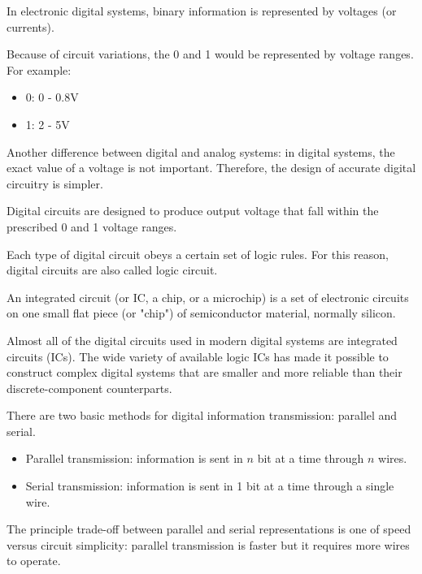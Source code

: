   \par In electronic digital systems, binary information is represented by voltages (or
  currents).
  \par Because of circuit variations, the 0 and 1 would be represented by voltage ranges.
  For example:
  \begin{itemize}
    \item 0: 0 - 0.8V
    \item 1: 2 - 5V
  \end{itemize}
  \par Another difference between digital and analog systems: in digital systems, the exact
  value of a voltage is not important. Therefore, the design of accurate digital circuitry is
  simpler.

    \par Digital circuits are designed to produce output voltage that fall within the
    prescribed 0 and 1 voltage ranges.
    \par Each type of digital circuit obeys a certain set of logic rules. For this reason, 
    digital circuits are also called logic circuit.
    \par An integrated circuit (or IC, a chip, or a microchip) is a set of electronic
    circuits on one small flat piece (or "chip") of semiconductor material, normally silicon.
    \par Almost all of the digital circuits used in modern digital systems are integrated
    circuits (ICs). The wide variety of available logic ICs has made it possible to construct
    complex digital systems that are smaller and more reliable than their discrete-component
    counterparts.

  \par There are two basic methods for digital information transmission: parallel and serial.
  \begin{itemize}
    \item Parallel transmission: information is sent in $n$ bit at a time through $n$ wires.
    \item Serial transmission: information is sent in 1 bit at a time through a single wire.
  \end{itemize}
  \par The principle trade-off between parallel and serial representations is one of speed
  versus circuit simplicity: parallel transmission is faster but it requires more wires to
  operate.

